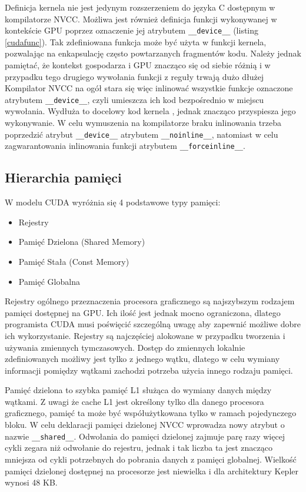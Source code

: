 Definicja kernela nie jest jedynym rozszerzeniem do języka C dostępnym w
kompilatorze NVCC. Możliwa jest również definicja funkcji wykonywanej w
kontekście GPU poprzez oznaczenie jej atrybutem \texttt{\_\_device\_\_} (listing
		\ref{cudafunc}). Tak zdefiniowana funkcja może być użyta w funkcji
kernela, pozwalając na enkapsulację często powtarzanych fragmentów kodu. Należy
jednak pamiętać, że kontekst gospodarza i GPU znacząco się od siebie różnią i w
przypadku tego drugiego wywołania funkcji z reguły trwają dużo
dłużej\cite{Nvillb} Kompilator NVCC na ogół stara się więc inlinować wszystkie
funkcje oznaczone atrybutem \texttt{\_\_device\_\_}, czyli umieszcza ich kod
bezpośrednio w miejscu wywołania. Wydłuża to docelowy kod kernela , jednak
znacząco przyspiesza jego wykonywanie. W celu wymuszenia na kompilatorze braku
inlinowania trzeba poprzedzić atrybut \texttt{\_\_device\_\_} atrybutem
\texttt{\_\_noinline\_\_}, natomiast w celu zagwarantowania inlinowania funkcji
atrybutem \texttt{\_\_forceinline\_\_}.

\subsection{Hierarchia pamięci}

W modelu CUDA wyróżnia się 4 podstawowe typy pamięci:
\begin{itemize}
\item Rejestry
\item Pamięć Dzielona (Shared Memory)
\item Pamięć Stała (Const Memory)
\item Pamięć Globalna
\end{itemize}

Rejestry ogólnego przeznaczenia procesora graficznego są najszybszym rodzajem
pamięci dostępnej na GPU.  Ich ilość jest jednak mocno ograniczona, dlatego
programista CUDA musi poświęcić szczególną uwagę aby zapewnić możliwe dobre ich
wykorzystanie. Rejestry są najczęściej alokowane w przypadku tworzenia i
używania zmiennych tymczasowych. Dostęp do zmiennych lokalnie zdefiniowanych
możliwy jest tylko z jednego wątku, dlatego w celu wymiany informacji pomiędzy
wątkami zachodzi potrzeba użycia innego rodzaju pamięci.

Pamięć dzielona to szybka pamięć L1 służąca do wymiany danych między wątkami.
Z uwagi że cache L1 jest określony tylko dla danego procesora graficznego,
  pamięć ta może być współużytkowana tylko w ramach pojedynczego bloku. W celu
  deklaracji pamięci dzielonej NVCC wprowadza nowy atrybut o nazwie
  \texttt{\_\_shared\_\_}. Odwołania do pamięci dzielonej zajmuje parę razy
  więcej cykli zegara niż odwołanie do rejestru, jednak i tak liczba ta jest
  znacząco mniejsza od cykli potrzebnych do pobrania danych z pamięci globalnej.
  Wielkość pamięci dzielonej dostępnej na procesorze jest niewielka i dla
  architektury Kepler wynosi 48 KB.


